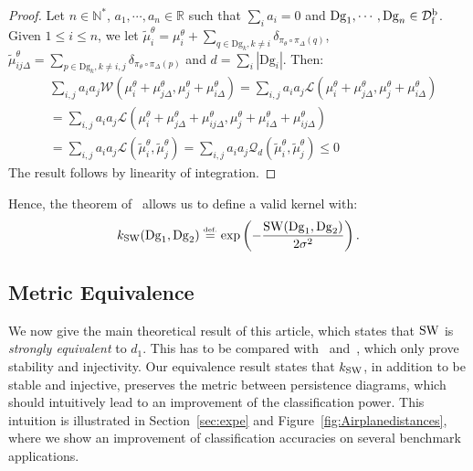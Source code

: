 \documentclass[11pt]{article}
\newcommand{\R}{\mathbb{R}}
\newcommand{\Dg}{\mathrm{Dg}}
\newcommand{\kSW}{k_{\rm SW}}
\newcommand{\SW}{{\rm SW}}
\newcommand{\SpfbD}{{\mathcal D}_{\rm f}^{\rm b}}
\newcommand{\eqdef}{\ensuremath{\stackrel{\mbox{\upshape\tiny def.}}{=}}}
\begin{document}
\begin{proof}

Let $n\in\mathbb{N}^*$, $a_1,\cdots,a_n\in\R$ such that $\sum_ia_i=0$ and $\Dg_1,\cdots,\Dg_n\in \SpfbD$.
Given $1\leq i\leq n$, we let 
$\tilde\mu_i^\theta=\mu_i^\theta + \sum_{q\in \Dg_k,k\neq i}\delta_{\pi_\theta\circ\pi_\Delta(q)}$, 
$\tilde\mu_{ij\Delta}^\theta=\sum_{p\in \Dg_k,k\neq i,j}\delta_{\pi_\theta\circ\pi_\Delta(p)}$ and $d=\sum_i |\Dg_i|$.
Then:
\begin{align}
&\sum_{i,j} a_ia_j \mathcal W(\mu_i^\theta+\mu_{j\Delta}^\theta,\mu_j^\theta+\mu_{i\Delta}^\theta)
=\sum_{i,j} a_ia_j\mathcal L(\mu_i^\theta+\mu_{j\Delta}^\theta,\mu_j^\theta+\mu_{i\Delta}^\theta)\nonumber \\
&=\sum_{i,j} a_ia_j\mathcal L(\mu_i^\theta+\mu_{j\Delta}^\theta+\mu_{ij\Delta}^\theta,\mu_j^\theta+\mu_{i\Delta}^\theta+\mu_{ij\Delta}^\theta)\nonumber\\
&= \sum_{i,j} a_ia_j\mathcal L(\tilde\mu_i^\theta,\tilde\mu_j^\theta)
= \sum_{i,j} a_ia_j\mathcal Q_d(\tilde\mu_i^\theta,\tilde\mu_j^\theta)\leq 0\nonumber
\end{align}  
The result follows by linearity of integration.







\end{proof}

Hence, the theorem of~\cite{Berg84}
allows us to define a valid kernel with: 
\begin{equation}\label{eq:kSW}
\kSW(\Dg_1,\Dg_2)\eqdef{\rm exp}\left(-\frac{\SW(\Dg_1,\Dg_2)}{2\sigma^2}\right).
\end{equation}



\subsection{Metric Equivalence}


We now give the main theoretical result of
this article, which states that $\SW$ is {\em strongly equivalent} to $d_1$.  
This has to be compared with~\cite{Reininghaus15} and~\cite{Kusano16}, which
only prove stability and injectivity. Our equivalence result
states that $\kSW$, in addition to be stable
and injective, preserves the metric between persistence diagrams, which should
intuitively lead to an improvement of the classification power. This
intuition is illustrated in Section~\ref{sec:expe} and
Figure~\ref{fig:Airplanedistances}, where we show an improvement of
classification accuracies on several benchmark applications.
\end{document}
